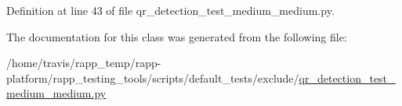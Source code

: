 Definition at line 43 of file qr\-\_\-detection\-\_\-test\-\_\-medium\-\_\-medium.\-py.



The documentation for this class was generated from the following file\-:\begin{DoxyCompactItemize}
\item 
/home/travis/rapp\-\_\-temp/rapp-\/platform/rapp\-\_\-testing\-\_\-tools/scripts/default\-\_\-tests/exclude/\hyperlink{qr__detection__test__medium__medium_8py}{qr\-\_\-detection\-\_\-test\-\_\-medium\-\_\-medium.\-py}\end{DoxyCompactItemize}
